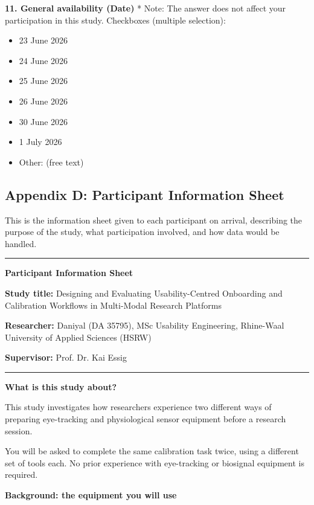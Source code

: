 \documentclass[
]{article}
\begin{document}
\textbf{11. General availability (Date)} * Note: The answer does not affect your participation in this study. Checkboxes (multiple selection):

\begin{itemize}
\item
  23 June 2026
\item
  24 June 2026
\item
  25 June 2026
\item
  26 June 2026
\item
  30 June 2026
\item
  1 July 2026
\item
  Other: (free text)
\end{itemize}



\clearpage
\hypertarget{appendix-c-participant-information-sheet}{%
\subsection{Appendix D: Participant Information Sheet}\label{appendix-c-participant-information-sheet}}

This is the information sheet given to each participant on arrival, describing the purpose of the study, what participation involved, and how data would be handled.

\noindent\rule{\linewidth}{0.4pt}

\textbf{Participant Information Sheet}

\textbf{Study title:} Designing and Evaluating Usability-Centred Onboarding and Calibration Workflows in Multi-Modal Research Platforms

\textbf{Researcher:} Daniyal (DA 35795), MSc Usability Engineering, Rhine-Waal University of Applied Sciences (HSRW)

\textbf{Supervisor:} Prof. Dr. Kai Essig

\noindent\rule{\linewidth}{0.4pt}

\textbf{What is this study about?}

This study investigates how researchers experience two different ways of preparing eye-tracking and physiological sensor equipment before a research session.

You will be asked to complete the same calibration task twice, using a different set of tools each. No prior experience with eye-tracking or biosignal equipment is required.

\textbf{Background: the equipment you will use}
\end{document}

